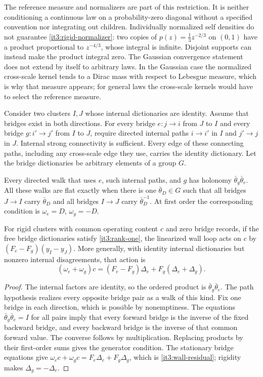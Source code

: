 The reference measure and normalizers are part of this restriction. It is neither conditioning a continuous law on a probability-zero diagonal without a specified convention nor integrating out children. Individually normalized self densities do not guarantee \cref{it3:rigid-normalizer}: two copies of $p(z)=\frac13z^{-2/3}$ on $(0,1)$ have a product proportional to $z^{-4/3}$, whose integral is infinite. Disjoint supports can instead make the product integral zero. The Gaussian convergence statement does not extend by itself to arbitrary laws. In the Gaussian case the normalized cross-scale kernel tends to a Dirac mass with respect to Lebesgue measure, which is why that measure appears; for general laws the cross-scale kernels would have to select the reference measure.

Consider two clusters $I,J$ whose internal dictionaries are identity. Assume that bridges exist in both directions. For every bridge $e:j\to i$ from $J$ to $I$ and every bridge $g:i'\to j'$ from $I$ to $J$, require directed internal paths $i\to i'$ in $I$ and $j'\to j$ in $J$. Internal strong connectivity is sufficient. Every edge of these connecting paths, including any cross-scale edge they use, carries the identity dictionary. Let the bridge dictionaries be arbitrary elements of a group $G$.

Every directed walk that uses $e$, such internal paths, and $g$ has holonomy $\bar\theta_g\bar\theta_e$. All these walks are flat exactly when there is one $\bar\theta_D\in G$ such that all bridges $J\to I$ carry $\bar\theta_D$ and all bridges $I\to J$ carry $\bar\theta_D^{-1}$. At first order the corresponding condition is $\omega_e=D$, $\omega_g=-D$.

For rigid clusters with common operating content $c$ and zero bridge records, if the free bridge dictionaries satisfy \cref{it3:rank-one}, the linearized wall loop acts on $c$ by $(F_e-F_g)(y_I-y_J)$. More generally, with identity internal dictionaries but nonzero internal disagreements, that action is
\begin{equation}
(\omega_e+\omega_g)c
=(F_e-F_g)\Delta_e+F_g(\Delta_e+\Delta_g).
\label{it3:wall-residual}
\end{equation}
\begin{proof}
The internal factors are identity, so the ordered product is $\bar\theta_g\bar\theta_e$. The path hypothesis realizes every opposite bridge pair as a walk of this kind. Fix one bridge in each direction, which is possible by nonemptiness. The equations $\bar\theta_g\bar\theta_e=I$ for all pairs imply that every forward bridge is the inverse of the fixed backward bridge, and every backward bridge is the inverse of that common forward value. The converse follows by multiplication. Replacing products by their first-order sums gives the generator condition. The stationary bridge equations give
$\omega_ec+\omega_gc=F_e\Delta_e+F_g\Delta_g$, which is \cref{it3:wall-residual}; rigidity makes $\Delta_g=-\Delta_e$.
\end{proof}

